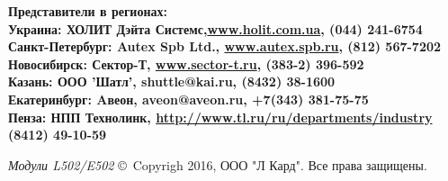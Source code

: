 \documentclass[12pt,a4paper,titlepage]{report}
\begin{document}
  \vspace{2mm}
  
  \begin{flushleft}
  \bfseries\large Представители в регионах:  \\
  \mdseries\normalsize Украина: ХОЛИТ Дэйта Системс,\href{http://www.holit.com.ua}{www.holit.com.ua}, (044) 241-6754 \\
  \mdseries\normalsize Санкт-Петербург: Autex Spb Ltd., \href{http://www.autex.spb.ru}{www.autex.spb.ru}, (812) 567-7202 \\
  \mdseries\normalsize Новосибирск: Сектор-Т, \href{http://www.sector-t.ru}{www.sector-t.ru}, (383-2) 396-592 \\
  \mdseries\normalsize Казань: ООО 'Шатл', shuttle@kai.ru, (8432) 38-1600  \\
  \mdseries\normalsize Екатеринбург: Aвеон, aveon@aveon.ru, +7(343) 381-75-75  \\
  \mdseries\normalsize Пенза: НПП Технолинк, \href{http://www.tl.ru/ru/departments/industry/}{http://www.tl.ru/ru/departments/industry} (8412) 49-10-59  \\
  \end{flushleft}
  
  
  \vspace{65mm}
  
  {\itshape Модули L502/E502} \copyright~Copyrigh 2016, ООО "Л Кард". Все права защищены.
  \newpage
  
\end{document}
